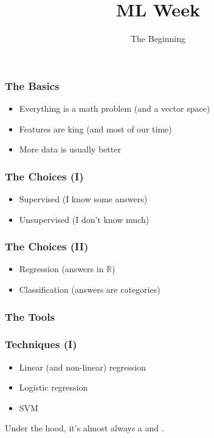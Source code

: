 
\title
{ML Week}
\subtitle{The Beginning}




\begin{frame}
  \titlepage
\end{frame}


\begin{frame}
  \frametitle{The Basics}

  \begin{itemize}
  \item Everything is a math problem (and a vector space)
  \item Features are king (and most of our time)
  \item More data is usually better
  \end{itemize}
\end{frame}

\begin{frame}
  \frametitle{The Choices (I)}
    
  \begin{itemize}
  \item Supervised (I know some answers)
  \item Unsupervised (I don't know much)
  \end{itemize}
\end{frame}

\begin{frame}
  \frametitle{The Choices (II)}
  \begin{itemize}
  \item Regression (answers in $\mathbb{R}$)
  \item Classification (answers are categories)
  \end{itemize}
\end{frame}

\begin{frame}
  \frametitle{The Tools}


  \vspace{1cm}
  \centerline{  }
\end{frame}

\begin{frame}
  \frametitle{Techniques (I)}

  \begin{itemize}
  \item Linear (and non-linear) regression
  \item Logistic regression
  \item SVM
  \end{itemize}

  Under the hood, it's almost always a  and
  .
\end{frame}

